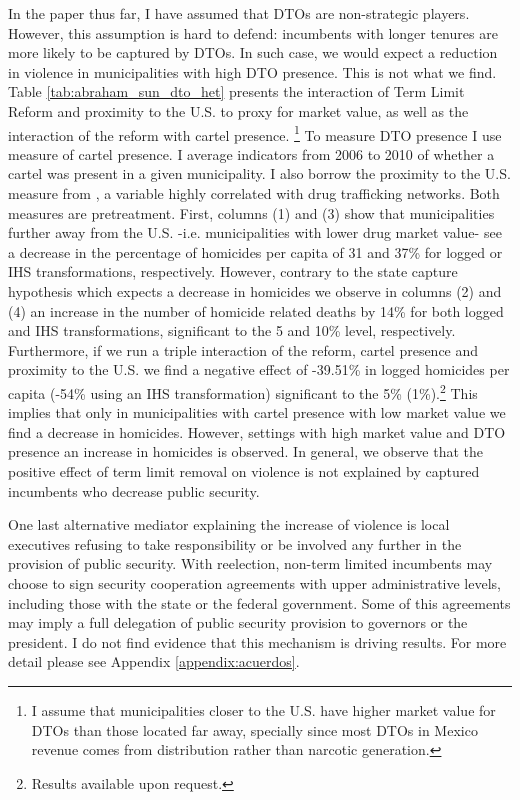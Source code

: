 \documentclass[12pt]{amsart}
\numberwithin{equation}{section}
\theoremstyle{definition}
\theoremstyle{definition}
\theoremstyle{definition}
\begin{document}
In the paper thus far, I have assumed that DTOs are non-strategic players. However, this assumption is hard to defend: incumbents with longer tenures are more likely to be captured by DTOs. In such case, we would expect a reduction in violence in municipalities with high DTO presence. This is not what we find. Table \ref{tab:abraham_sun_dto_het} presents the interaction of Term Limit Reform and proximity to the U.S. to proxy for market value, as well as the interaction of the reform with cartel presence. %
\footnote{I assume that municipalities closer to the U.S. have higher market value for DTOs than those located far away, specially since most DTOs in Mexico revenue comes from distribution rather than narcotic generation.} To measure DTO presence I use \citet{camilo_etal_2018} measure of cartel presence. I average indicators from 2006 to 2010 of whether a cartel was present in a given municipality. I also borrow the proximity to the U.S. measure from \citet{camilo_etal_2018}, a variable highly correlated with drug trafficking networks. Both measures are pretreatment. First, columns (1) and (3) show that municipalities further away from the U.S. -i.e. municipalities with lower drug market value- see a decrease in the percentage of homicides per capita of 31 and 37\% for logged or IHS transformations, respectively. However, contrary to the state capture hypothesis which expects a decrease in homicides we observe in columns (2) and (4) an increase in the number of homicide related deaths by 14\% for both logged and IHS transformations, significant to the 5 and 10\% level, respectively. Furthermore, if we run a triple interaction of the reform, cartel presence and proximity to the U.S. we find a negative effect of -39.51\% in logged homicides per capita (-54\% using an IHS transformation) significant to the 5\% (1\%).\footnote{Results available upon request.} This implies that only in municipalities with cartel presence with low market value we find a decrease in homicides. However, settings with high market value and DTO presence an increase in homicides is observed. In general, we observe that the positive effect of term limit removal on violence is not explained by captured incumbents who decrease public security. 

 
   
  
  One last alternative mediator explaining the increase of violence is local executives refusing to take responsibility or be involved any further in the provision of public security. With reelection, non-term limited incumbents may choose to sign security cooperation agreements with upper administrative levels, including those with the state or the federal government. Some of this agreements may imply a full delegation of public security provision to governors or the president. I do not find evidence that this mechanism is driving results. For more detail please see Appendix \ref{appendix:acuerdos}.
  
\end{document}
